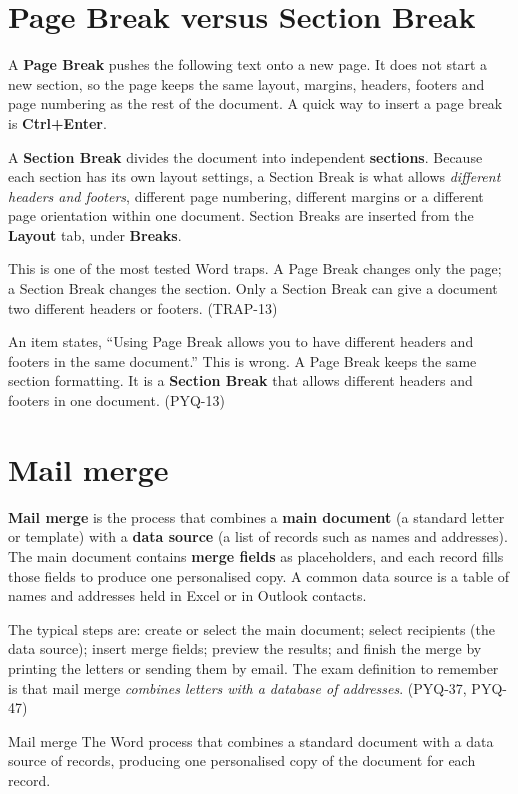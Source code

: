 \section{Page Break versus Section Break}
A \textbf{Page Break} pushes the following text onto a new page. It does not
start a new section, so the page keeps the same layout, margins, headers,
footers and page numbering as the rest of the document. A quick way to insert a
page break is \textbf{Ctrl+Enter}.

A \textbf{Section Break} divides the document into independent
\textbf{sections}. Because each section has its own layout settings, a Section
Break is what allows \emph{different headers and footers}, different page
numbering, different margins or a different page orientation within one
document. Section Breaks are inserted from the \textbf{Layout} tab, under
\textbf{Breaks}.

This is one of the most tested Word traps. A Page Break changes only the page; a
Section Break changes the section. Only a Section Break can give a document two
different headers or footers. (TRAP-13)

\begin{example}
An item states, ``Using Page Break allows you to have different headers and
footers in the same document.'' This is wrong. A Page Break keeps the same
section formatting. It is a \textbf{Section Break} that allows different
headers and footers in one document. (PYQ-13)
\end{example}

\section{Mail merge}
\textbf{Mail merge} is the process that combines a \textbf{main document} (a
standard letter or template) with a \textbf{data source} (a list of records
such as names and addresses). The main document contains \textbf{merge fields}
as placeholders, and each record fills those fields to produce one personalised
copy. A common data source is a table of names and addresses held in Excel or
in Outlook contacts.

The typical steps are: create or select the main document; select recipients
(the data source); insert merge fields; preview the results; and finish the
merge by printing the letters or sending them by email. The exam definition to
remember is that mail merge \emph{combines letters with a database of
addresses}. (PYQ-37, PYQ-47)

\begin{definitionbox}{Mail merge}
The Word process that combines a standard document with a data source of
records, producing one personalised copy of the document for each record.
\end{definitionbox}

